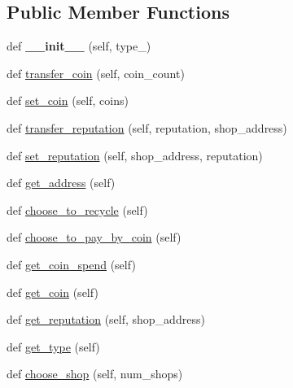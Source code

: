 \subsection*{Public Member Functions}
\begin{DoxyCompactItemize}
\item 
\mbox{\label{class_customer_1_1_customer_a448ae44d7fd2fecfff3bcaa607c0611a}} 
def {\bfseries \+\_\+\+\_\+init\+\_\+\+\_\+} (self, type\+\_\+)
\item 
def \mbox{\hyperlink{class_customer_1_1_customer_ace618f142ffda53d5538c0f354a0457a}{transfer\+\_\+coin}} (self, coin\+\_\+count)
\item 
def \mbox{\hyperlink{class_customer_1_1_customer_a61ab0c880d31a2f0d87d71f9d708ca45}{set\+\_\+coin}} (self, coins)
\item 
def \mbox{\hyperlink{class_customer_1_1_customer_a36bf1ca43a67bf563793e1ad7558711f}{transfer\+\_\+reputation}} (self, reputation, shop\+\_\+address)
\item 
def \mbox{\hyperlink{class_customer_1_1_customer_a7179b6123d3b732082c5724e7d416ab3}{set\+\_\+reputation}} (self, shop\+\_\+address, reputation)
\item 
def \mbox{\hyperlink{class_customer_1_1_customer_a77531667290ff6b0c5547ebf17930098}{get\+\_\+address}} (self)
\item 
def \mbox{\hyperlink{class_customer_1_1_customer_aecee1601bb165a1a341d65c2041a3cbf}{choose\+\_\+to\+\_\+recycle}} (self)
\item 
def \mbox{\hyperlink{class_customer_1_1_customer_a86df6d77038d58a8497b0dbcdb0d3872}{choose\+\_\+to\+\_\+pay\+\_\+by\+\_\+coin}} (self)
\item 
def \mbox{\hyperlink{class_customer_1_1_customer_a4c3a13a45a42e3179d30c75ccde32ec3}{get\+\_\+coin\+\_\+spend}} (self)
\item 
def \mbox{\hyperlink{class_customer_1_1_customer_a132ab8cbc2cdf93767fd1e7f295636c2}{get\+\_\+coin}} (self)
\item 
def \mbox{\hyperlink{class_customer_1_1_customer_a6053111a21363f88cbd7f296342d450d}{get\+\_\+reputation}} (self, shop\+\_\+address)
\item 
def \mbox{\hyperlink{class_customer_1_1_customer_afde17ca03b3a788bf821f3fa0309fd55}{get\+\_\+type}} (self)
\item 
def \mbox{\hyperlink{class_customer_1_1_customer_a38dfeb79b9aaa0e75bd78f3a5e23e71e}{choose\+\_\+shop}} (self, num\+\_\+shops)
\end{DoxyCompactItemize}
